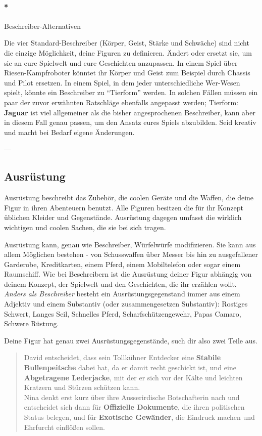 \documentclass[]{article}
\let\oldparagraph\paragraph
\renewcommand{\paragraph}[1]{\oldparagraph{#1}\mbox{}}
\begin{document}
\paragraph*{Beschreiber-Alternativen}\label{beschreiber-alternativen}

Die vier Standard-Beschreiber (Körper, Geist, Stärke und Schwäche) sind
nicht die einzige Möglichkeit, deine Figuren zu definieren. Ändert oder
ersetzt sie, um sie an eure Spielwelt und eure Geschichten anzupassen.
In einem Spiel über Riesen-Kampfroboter könntet ihr Körper und Geist zum
Beispiel durch Chassis und Pilot ersetzen. In einem Spiel, in dem jeder
unterschiedliche Wer-Wesen spielt, könnte ein Beschreiber zu
``Tierform'' werden. In solchen Fällen müssen ein paar der zuvor
erwähnten Ratschläge ebenfalls angepasst werden; Tierform:
\textbf{Jaguar} ist viel allgemeiner als die bisher angesprochenen
Beschreiber, kann aber in diesem Fall genau passen, um den Ansatz eures
Spiels abzubilden. Seid kreativ und macht bei Bedarf eigene Änderungen.

\columnsend
---

\subsection{Ausrüstung}\label{ausruxfcstung}

Ausrüstung beschreibt das Zubehör, die coolen Geräte und die Waffen, die
deine Figur in ihren Abenteuern benutzt. Alle Figuren besitzen die für
ihr Konzept üblichen Kleider und Gegenstände. Ausrüstung dagegen umfasst
die wirklich wichtigen und coolen Sachen, die sie bei sich tragen.

Ausrüstung kann, genau wie Beschreiber, Würfelwürfe modifizieren. Sie
kann aus allem Möglichen bestehen - von Schusswaffen über Messer bis hin
zu ausgefallener Garderobe, Kreditkarten, einem Pferd, einem
Mobiltelefon oder sogar einem Raumschiff. Wie bei Beschreibern ist die
Ausrüstung deiner Figur abhängig von deinem Konzept, der Spielwelt und
den Geschichten, die ihr erzählen wollt. \emph{Anders als Beschreiber}
besteht ein Ausrüstungsgegenstand immer aus einem Adjektiv und einem
Substantiv (oder zusammengesetzen Substantiv): Rostiges Schwert, Langes
Seil, Schnelles Pferd, Scharfschützengewehr, Papas Camaro, Schwere
Rüstung.

Deine Figur hat genau zwei Ausrüstungsgegenstände, such dir also zwei
Teile aus.

\begin{quote}
David entscheidet, dass sein Tollkühner Entdecker eine \textbf{Stabile
Bullenpeitsche} dabei hat, da er damit recht geschickt ist, und eine
\textbf{Abgetragene Lederjacke}, mit der er sich vor der Kälte und
leichten Kratzern und Stürzen schützen kann.\\
Nina denkt erst kurz über ihre Ausserirdische Botschafterin nach und
entscheidet sich dann für \textbf{Offizielle Dokumente}, die ihren
politischen Status belegen, und für \textbf{Exotische Gewänder}, die
Eindruck machen und Ehrfurcht einflößen sollen.
\end{quote}
\end{document}
